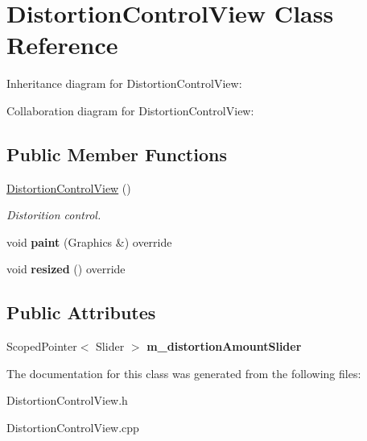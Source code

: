 \hypertarget{class_distortion_control_view}{}\section{Distortion\+Control\+View Class Reference}
\label{class_distortion_control_view}


Inheritance diagram for Distortion\+Control\+View\+:


Collaboration diagram for Distortion\+Control\+View\+:
\subsection*{Public Member Functions}
\begin{DoxyCompactItemize}
\item 
\hyperlink{class_distortion_control_view_a8dda7418cb68052a58d943e2f1892a84}{Distortion\+Control\+View} ()\hypertarget{class_distortion_control_view_a8dda7418cb68052a58d943e2f1892a84}{}\label{class_distortion_control_view_a8dda7418cb68052a58d943e2f1892a84}

\begin{DoxyCompactList}\small\item\em Distorition control. \end{DoxyCompactList}\item 
void {\bfseries paint} (Graphics \&) override\hypertarget{class_distortion_control_view_a03abd1bccb8f132c3a35224ae5774ad0}{}\label{class_distortion_control_view_a03abd1bccb8f132c3a35224ae5774ad0}

\item 
void {\bfseries resized} () override\hypertarget{class_distortion_control_view_a12910f9c5347b7ad5b0346680f70494a}{}\label{class_distortion_control_view_a12910f9c5347b7ad5b0346680f70494a}

\end{DoxyCompactItemize}
\subsection*{Public Attributes}
\begin{DoxyCompactItemize}
\item 
Scoped\+Pointer$<$ Slider $>$ {\bfseries m\+\_\+distortion\+Amount\+Slider}\hypertarget{class_distortion_control_view_ac48a62ec1569b005a6d8dbd7b6b462be}{}\label{class_distortion_control_view_ac48a62ec1569b005a6d8dbd7b6b462be}

\end{DoxyCompactItemize}


The documentation for this class was generated from the following files\+:\begin{DoxyCompactItemize}
\item 
Distortion\+Control\+View.\+h\item 
Distortion\+Control\+View.\+cpp\end{DoxyCompactItemize}
